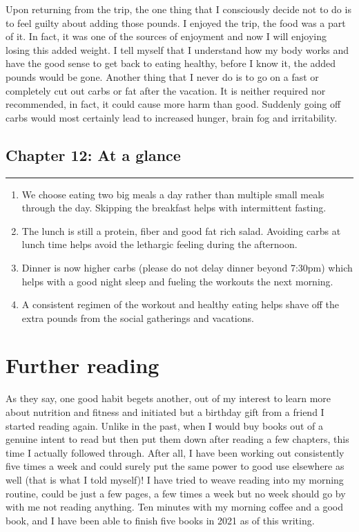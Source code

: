 \documentclass[
  oneside]{book}
\begin{document}
Upon returning from the trip, the one thing that I consciously decide not to do is to feel guilty about adding those pounds. I enjoyed the trip, the food was a part of it. In fact, it was one of the sources of enjoyment and now I will enjoying losing this added weight. I tell myself that I understand how my body works and have the good sense to get back to eating healthy, before I know it, the added pounds would be gone. Another thing that I never do is to go on a fast or completely cut out carbs or fat after the vacation. It is neither required nor recommended, in fact, it could cause more harm than good. Suddenly going off carbs would most certainly lead to increased hunger, brain fog and irritability.

\hypertarget{chapter-12-at-a-glance}{%
\section{Chapter 12: At a glance}\label{chapter-12-at-a-glance}}

\begin{center}\rule{0.5\linewidth}{0.5pt}\end{center}

\begin{enumerate}
\def\labelenumi{\arabic{enumi}.}
\item
  We choose eating two big meals a day rather than multiple small meals through the day. Skipping the breakfast helps with intermittent fasting.
\item
  The lunch is still a protein, fiber and good fat rich salad. Avoiding carbs at lunch time helps avoid the lethargic feeling during the afternoon.
\item
  Dinner is now higher carbs (please do not delay dinner beyond 7:30pm) which helps with a good night sleep and fueling the workouts the next morning.
\item
  A consistent regimen of the workout and healthy eating helps shave off the extra pounds from the social gatherings and vacations.
\end{enumerate}

\hypertarget{further-reading}{%
\chapter{Further reading}\label{further-reading}}

As they say, one good habit begets another, out of my interest to learn more about nutrition and fitness and initiated but a birthday gift from a friend I started reading again. Unlike in the past, when I would buy books out of a genuine intent to read but then put them down after reading a few chapters, this time I actually followed through. After all, I have been working out consistently five times a week and could surely put the same power to good use elsewhere as well (that is what I told myself)! I have tried to weave reading into my morning routine, could be just a few pages, a few times a week but no week should go by with me not reading anything. Ten minutes with my morning coffee and a good book, and I have been able to finish five books in 2021 as of this writing.
\end{document}
